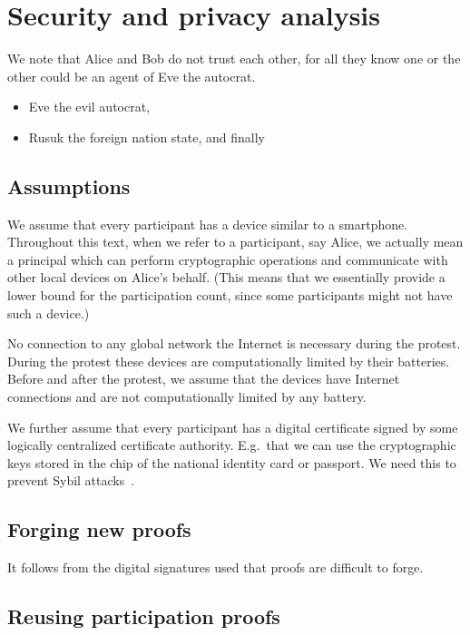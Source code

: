 \section{Security and privacy analysis}%
\label{SecurityAnalysis}

We note that Alice and Bob do not trust each other, for all they know one or the 
other could be an agent of Eve the autocrat.
\begin{itemize}
  \item Eve the evil autocrat,
  \item Rusuk the foreign nation state, and finally
\end{itemize}

\subsection{Assumptions}

We assume that every participant has a device similar to a smartphone.
Throughout this text, when we refer to a participant, say Alice, we actually 
mean a principal which can perform cryptographic operations and communicate with 
other local devices on Alice's behalf.
(This means that we essentially provide a lower bound for the participation 
count, since some participants might not have such a device.)

No connection to any global network the Internet is necessary during the 
protest.
During the protest these devices are computationally limited by their 
batteries.
Before and after the protest, we assume that the devices have Internet 
connections and are not computationally limited by any battery.

We further assume that every participant has a digital certificate signed by 
some logically centralized certificate authority.
E.g.\ that we can use the cryptographic keys stored in the chip of the national 
identity card or passport.
We need this to prevent Sybil attacks~\cite{SybilAttack}.

\subsection{Forging new proofs}

It follows from the digital signatures used that proofs are difficult to forge.

\subsection{Reusing participation proofs}


